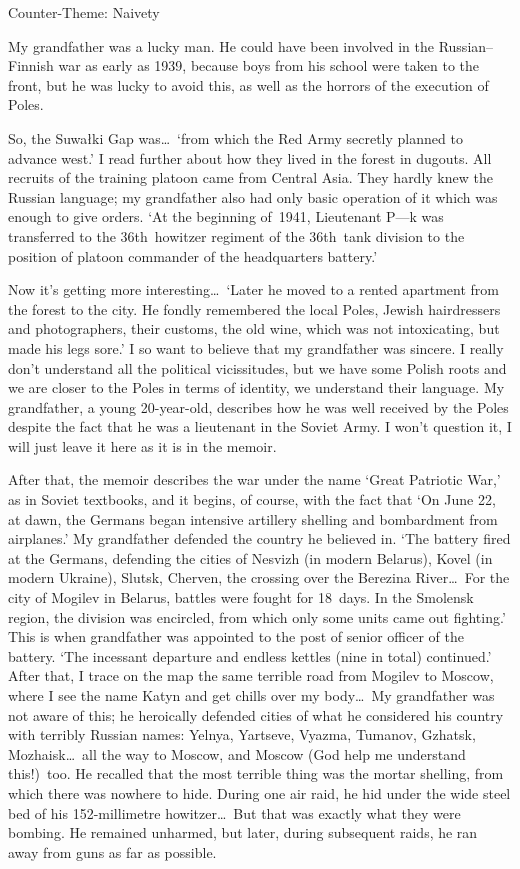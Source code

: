 Counter-Theme: Naivety

My grandfather was a lucky man. He could have been involved in the
Russian--Finnish war as early as 1939, because boys from his school
were taken to the front, but he was lucky to avoid this, as well as
the horrors of the execution of Poles.

So, the Suwa{\l}ki Gap was\ldots\ `from which the Red Army secretly planned
to advance west.' I read further about how they lived in the forest in
dugouts. All recruits of the training platoon came from Central
Asia. They hardly knew the Russian language; my grandfather also had
only basic operation of it which was enough to give orders. `At the
beginning of~1941, Lieutenant P---k was transferred to the 36th~howitzer
regiment of the 36th~tank division to the position of platoon
commander of the headquarters battery.'

Now it's getting more interesting\ldots\  `Later he moved to a rented
apartment from the forest to the city. He fondly remembered the local
Poles, Jewish hairdressers and photographers, their customs, the old
wine, which was not intoxicating, but made his legs sore.' I so want
to believe that my grandfather was sincere. I really don't understand
all the political vicissitudes, but we have some Polish roots and we
are closer to the Poles in terms of identity, we understand their
language. My grandfather, a young 20-year-old, describes how he was
well received by the Poles despite the fact that he was a lieutenant
in the Soviet Army. I won't question it, I will just leave it here as
it is in the memoir.

After that, the memoir describes the war under the name `Great
Patriotic War,' as in Soviet textbooks, and it begins, of course, with
the fact that `On June 22, at dawn, the Germans began intensive
artillery shelling and bombardment from airplanes.' My grandfather
defended the country he believed in. `The battery fired at the
Germans, defending the cities of Nesvizh (in modern Belarus), Kovel
(in modern Ukraine), Slutsk, Cherven, the crossing over the Berezina
River\ldots\ For the city of Mogilev in Belarus, battles were fought
for 18~days. In the Smolensk region, the division was encircled, from
which only some units came out fighting.' This is when grandfather was
appointed to the post of senior officer of the battery. `The
incessant departure and endless kettles %
(nine in
total) continued.' After that, I trace on the map the same terrible
road from Mogilev to Moscow, where I see the name Katyn and get chills
over my body\ldots\ My grandfather was not aware of this; he heroically
defended cities of what he considered his country with terribly
Russian names: Yelnya, Yartseve, Vyazma, Tumanov, Gzhatsk,
Mozhaisk\ldots\ all the way to Moscow, and Moscow (God help me
understand this!)~too. He recalled that the most terrible thing was
the mortar shelling, from which there was nowhere to hide. During one
air raid, he hid under the wide steel bed of his 152-millimetre
howitzer\ldots\ But that was exactly what they were bombing. He
remained unharmed, but later, during subsequent raids, he ran away
from guns as far as possible.

